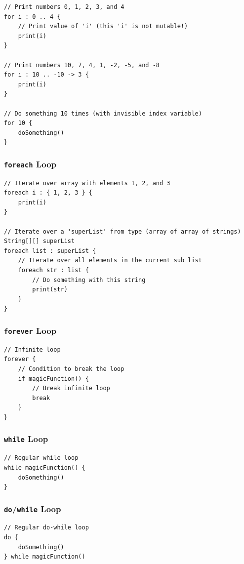 \documentclass{report}
\begin{document}
\begin{lstlisting}
// Print numbers 0, 1, 2, 3, and 4
for i : 0 .. 4 {
    // Print value of 'i' (this 'i' is not mutable!)
    print(i)
}

// Print numbers 10, 7, 4, 1, -2, -5, and -8
for i : 10 .. -10 -> 3 {
    print(i)
}

// Do something 10 times (with invisible index variable)
for 10 {
    doSomething()
}
\end{lstlisting}

\subsubsection{\texttt{foreach} Loop}

\begin{lstlisting}
// Iterate over array with elements 1, 2, and 3
foreach i : { 1, 2, 3 } {
    print(i)
}

// Iterate over a 'superList' from type (array of array of strings)
String[][] superList
foreach list : superList {
    // Iterate over all elements in the current sub list
    foreach str : list {
        // Do something with this string
        print(str)
    }
}
\end{lstlisting}

\subsubsection{\texttt{forever} Loop}

\begin{lstlisting}
// Infinite loop
forever {
    // Condition to break the loop
    if magicFunction() {
        // Break infinite loop
        break
    }
}
\end{lstlisting}

\subsubsection{\texttt{while} Loop}

\begin{lstlisting}
// Regular while loop
while magicFunction() {
    doSomething()
}
\end{lstlisting}

\subsubsection{\texttt{do}/\texttt{while} Loop}

\begin{lstlisting}
// Regular do-while loop
do {
    doSomething()
} while magicFunction()
\end{lstlisting}
\end{document}
